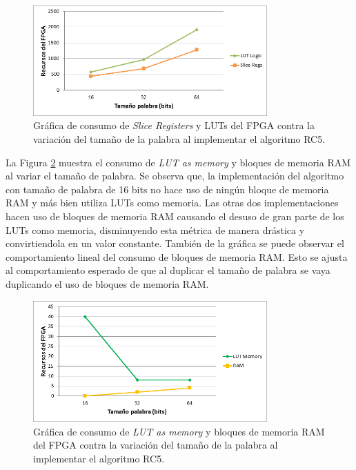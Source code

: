 \begin{figure}[H]
	\centering
	\includegraphics[width=0.8\textwidth]{./images/figSliceRegsLutsRC5}
	\caption{Gráfica de consumo de \textit{Slice Registers} y LUTs del FPGA contra la variación del tamaño de la palabra al implementar el algoritmo RC5.}
	\label{figSliceRegsLutsRC5}
\end{figure}

La Figura \ref{figRamRC5} muestra el consumo de \textit{LUT as memory} y bloques de memoria RAM al variar el tamaño de palabra. Se observa que, la implementación del algoritmo con tamaño de palabra de 16 bits no hace uso de ningún bloque de memoria RAM y más bien utiliza LUTs como memoria. Las otras dos implementaciones hacen uso de bloques de memoria RAM causando el desuso de gran parte de los LUTs como memoria, disminuyendo esta métrica de manera drástica y convirtiendola en un valor constante. También de la gráfica se puede observar el comportamiento lineal del consumo de bloques de memoria RAM. Esto se ajusta al comportamiento esperado de que al duplicar el tamaño de palabra se vaya duplicando el uso de bloques de memoria RAM.
\begin{figure}[H]
	\centering
	\includegraphics[width=0.8\textwidth]{./images/figRamRC5}
	\caption{Gráfica de consumo de \textit{LUT as memory} y bloques de memoria RAM del FPGA contra la variación del tamaño de la palabra al implementar el algoritmo RC5.}
	\label{figRamRC5}
\end{figure}

